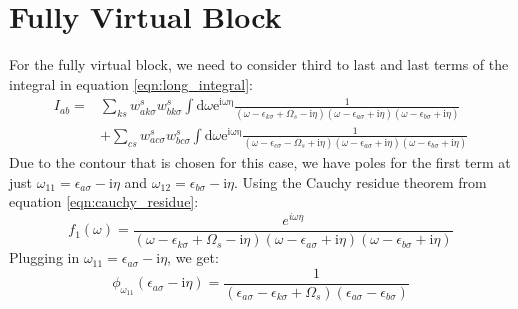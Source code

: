 \documentclass[12pt]{article}
\begin{document}
\section{Fully Virtual Block}
For the fully virtual block, we need to consider third to last and last terms of the integral in equation \ref{eqn:long_integral}:
\begin{equation}
\begin{aligned}
I_{ab} =& \sum_{ks} w_{a k \sigma}^s w_{b k \sigma}^s \int \mathrm{d} \omega \mathrm{e}^{\mathrm{i \omega \eta}} \frac{1}{(\omega-\epsilon_{k \sigma}+\Omega_s-\mathrm{i} \eta)(\omega-\epsilon_{a \sigma}+\mathrm{i} \eta)(\omega-\epsilon_{b \sigma}+\mathrm{i} \eta)}\\
& + \sum_{cs} w_{a c \sigma}^s w_{b c \sigma}^s \int \mathrm{d} \omega \mathrm{e}^{\mathrm{i \omega \eta}} \frac{1}{(\omega-\epsilon_{c \sigma}-\Omega_s+\mathrm{i} \eta)(\omega-\epsilon_{a \sigma}+\mathrm{i} \eta)(\omega-\epsilon_{b \sigma}+\mathrm{i} \eta)}
\end{aligned}
\end{equation}
Due to the contour that is chosen for this case, we have poles for the first term at just $\omega_{11} = \epsilon _{a \sigma } - \mathrm{i} \eta$ and $\omega_{12} = \epsilon _{b \sigma } - \mathrm{i} \eta$. Using the Cauchy residue theorem from equation \ref{eqn:cauchy_residue}:
\begin{equation}
f_1(\omega) = \frac{e^{i\omega \eta }}{(\omega-\epsilon_{k \sigma}+\Omega_s-\mathrm{i} \eta)(\omega-\epsilon_{a \sigma}+\mathrm{i} \eta)(\omega-\epsilon_{b \sigma}+\mathrm{i} \eta)}
\end{equation}
Plugging in $\omega_{11} = \epsilon _{a \sigma } - \mathrm{i} \eta$, we get:
\begin{equation}
\boxed{\phi_{\omega_{11}}(\epsilon_{a \sigma} - \mathrm{i} \eta) = \frac{1}{(\epsilon_{a \sigma} -\epsilon_{k \sigma}+\Omega_s)(\epsilon_{a \sigma} -\epsilon_{b \sigma})}}
\end{equation}
\end{document}
